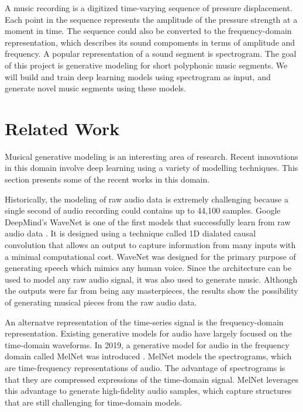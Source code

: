 \documentclass[sigconf,authorversion]{acmart}
\begin{document}
A music recording is a digitized time-varying sequence of pressure displacement. Each point in the 
sequence represents the amplitude of the pressure strength at a moment in time. The sequence could 
also be converted to the frequency-domain representation, which describes its sound compoments in terms 
of amplitude and frequency. A popular representation of a sound segment is spectrogram. The goal of this 
project is generative modeling for short polyphonic music segments. We will build and train deep learning 
models using spectrogram as input, and generate novel music segments using these models.

\section{Related Work}

Musical generative modeling is an interesting area of research. Recent innovations in this domain involve
deep learning using a variety of modelling techniques. This section presents some of the recent works in
this domain.

Historically, the modeling of raw audio data is extremely challenging because a single second of audio recording
could contains up to 44,100 samples. Google DeepMind's WaveNet is one of the first models
that successfully learn from raw audio data \cite{oord_wavenet_2016}. It is designed using a technique called 
1D dialated causal convolution that allows an output to capture information from many inputs with a minimal
computational cost. WaveNet was designed for the primary purpose of generating speech which mimics any human voice.
Since the architecture can be used to model any raw audio signal, it was also used to generate music.
Although the outputs were far from being any masterpieces, the results show the possibility of generating musical
pieces from the raw audio data.

An alternatve representation of the time-series signal is the frequency-domain representation. Existing generative
models for audio have largely focused on the time-domain waveforms. In 2019, a generative model for audio in the
frequency domain called MelNet was introduced \cite{vasquez2019melnet}. MelNet models the spectrograms, which are
time-frequency representations of audio. The advantage of spectrograms is that they are compressed expressions of 
the time-domain signal. MelNet leverages this advantage to generate high-fidelity audio samples, which capture 
structures that are still challenging for time-domain models. 
\end{document}
